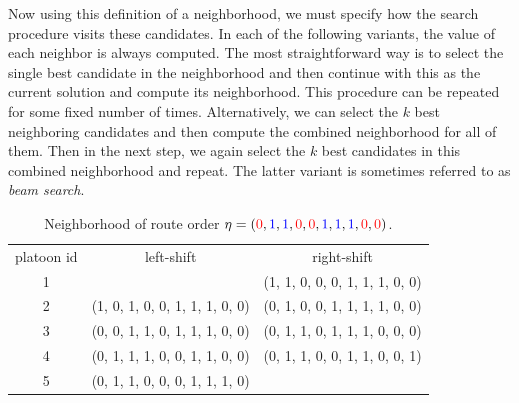 \documentclass[a4paper]{article}
\theoremstyle{definition}
\theoremstyle{plain}
\newtheorem{proposition}{Proposition}
\begin{document}
Now using this definition of a neighborhood, we must specify how the search
procedure visits these candidates.
In each of the following variants, the value of each neighbor is always computed.
%
The most straightforward way is to select the single best candidate in the
neighborhood and then continue with this as the current solution and compute its
neighborhood. This procedure can be repeated for some fixed number of times.
Alternatively, we can select the $k$ best neighboring candidates and then
compute the combined neighborhood for all of them. Then in the next step, we
again select the $k$ best candidates in this combined neighborhood and repeat.
The latter variant is sometimes referred to as \textit{beam search}.

\newcommand*{\1}{{\color{blue}1}}%
\newcommand*{\0}{{\color{red}0}}%

\begin{table}
\begin{center}
\begin{tabular}{c|c|c}
  platoon id  & left-shift & right-shift \\
  1 &  & (\1, \1, \0, \0, \0, \1, \1, \1, \0, \0) \\
  2 & (\1, \0, \1, \0, \0, \1, \1, \1, \0, \0) & (\0, \1, \0, \0, \1, \1, \1, \1, \0, \0) \\
  3 & (\0, \0, \1, \1, \0, \1, \1, \1, \0, \0) & (\0, \1, \1, \0, \1, \1, \1, \0, \0, \0) \\
  4 & (\0, \1, \1, \1, \0, \0, \1, \1, \0, \0) & (\0, \1, \1, \0, \0, \1, \1, \0, \0, \1) \\
  5 & (\0, \1, \1, \0, \0, \0, \1, \1, \1, \0) &
\end{tabular}
\end{center}
\caption{Neighborhood of route order $\eta = (\0, \1, \1, \0, \0, \1, \1, \1, \0, \0)$.}
\label{tab:local_search}
\end{table}




\end{document}
